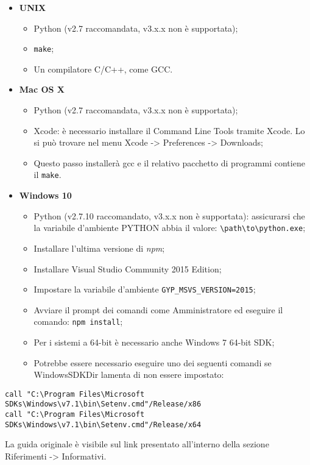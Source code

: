 \begin{itemize}
	\item \textbf{UNIX}
	\begin{itemize}
		\item Python (v2.7 raccomandata, v3.x.x non è supportata);
		\item \texttt{make};
		\item Un compilatore C/C++, come GCC.
	\end{itemize}
	\item \textbf{Mac OS X}
	\begin{itemize}
		\item Python (v2.7 raccomandata, v3.x.x non è supportata);
		\item Xcode: è necessario installare il Command Line Tools tramite Xcode. Lo si può trovare nel menu Xcode -> Preferences -> Downloads;
		\item Questo passo installerà gcc e il relativo pacchetto di programmi contiene il \texttt{make}.
	\end{itemize}
	\item \textbf{Windows 10}
	\begin{itemize}
		\item Python (v2.7.10 raccomandato, v3.x.x non è supportata): assicurarsi che la variabile d'ambiente PYTHON abbia il valore: \verb|\path\to\python.exe|;
		\item Installare l'ultima versione di \textit{npm};
		\item Installare Visual Studio Community 2015 Edition;
		\item Impostare la variabile d'ambiente \verb|GYP_MSVS_VERSION=2015|;
		\item Avviare il prompt dei comandi come Amministratore ed eseguire il comando: \texttt{npm install};
		\item Per i sistemi a 64-bit è necessario anche Windows 7 64-bit SDK;
		\item Potrebbe essere necessario eseguire uno dei seguenti comandi se WindowsSDKDir lamenta di non essere impostato:
	\end{itemize}
\end{itemize}
	\begin{center}
		\verb|call "C:\Program Files\Microsoft SDKs\Windows\v7.1\bin\Setenv.cmd"/Release/x86|\\
		\verb|call "C:\Program Files\Microsoft SDKs\Windows\v7.1\bin\Setenv.cmd"/Release/x64|\\
	\end{center}
La guida originale è visibile sul link presentato all'interno della sezione Riferimenti -> Informativi.
